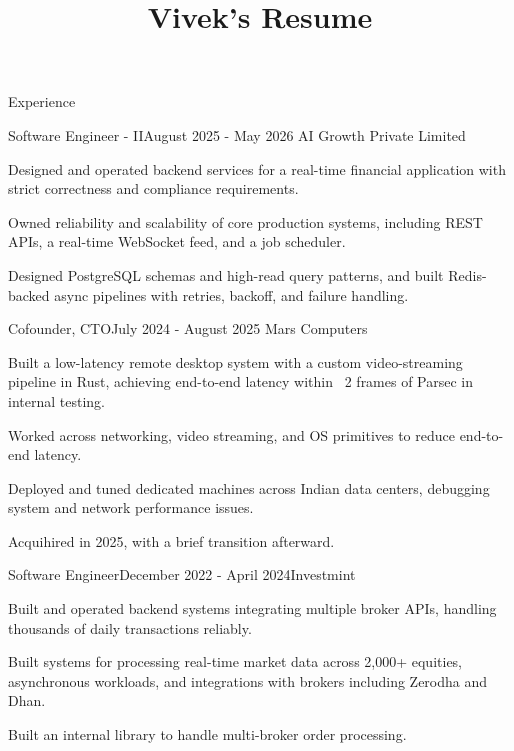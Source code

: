 \documentclass{resume} %
\begin{document}
\title{Vivek's Resume}

\begin{rSection}{Experience}
\begin{rSubsection}{Software Engineer - II}{August 2025 - May 2026}
{AI Growth Private Limited}{}
\item Designed and operated backend services for a real-time financial application with strict correctness and compliance requirements.
\item Owned reliability and scalability of core production systems, including REST APIs, a real-time WebSocket feed, and a job scheduler.
\item Designed PostgreSQL schemas and high-read query patterns, and built Redis-backed async pipelines with retries, backoff, and failure handling.
\end{rSubsection}
    
\begin{rSubsection}{Cofounder, CTO}{July 2024 - August 2025}
{Mars Computers}{}
\item Built a low-latency remote desktop system with a custom video-streaming pipeline in Rust, achieving end-to-end latency within ~2 frames of Parsec in internal testing.
\item Worked across networking, video streaming, and OS primitives to reduce end-to-end latency.
\item Deployed and tuned dedicated machines across Indian data centers, debugging system and network performance issues.
\item Acquihired in 2025, with a brief transition afterward.
\end{rSubsection}

\begin{rSubsection}{Software Engineer}{December 2022 - April 2024}{Investmint}{}
\item Built and operated backend systems integrating multiple broker APIs, handling thousands of daily transactions reliably.
\item Built systems for processing real-time market data across 2,000+ equities, asynchronous workloads, and integrations with brokers including Zerodha and Dhan.
\item Built an internal library to handle multi-broker order processing.
\end{rSubsection}
\end{rSection}
\end{document}

